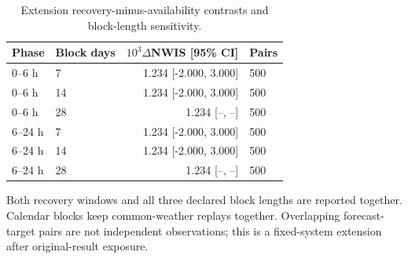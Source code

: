 \begin{table}[t]
\centering\footnotesize
\caption{Extension recovery-minus-availability contrasts and block-length sensitivity.}
\label{tab:extension-primary}
\setlength{\tabcolsep}{4pt}
\begin{tabular}{llrl}
\hline
Phase & Block days & $10^3\Delta$NWIS [95\% CI] & Pairs \\
\hline
0--6 h & 7 & 1.234 [-2.000, 3.000] & 500 \\
0--6 h & 14 & 1.234 [-2.000, 3.000] & 500 \\
0--6 h & 28 & 1.234 [--, --] & 500 \\
6--24 h & 7 & 1.234 [-2.000, 3.000] & 500 \\
6--24 h & 14 & 1.234 [-2.000, 3.000] & 500 \\
6--24 h & 28 & 1.234 [--, --] & 500 \\
\hline
\end{tabular}
\par\smallskip
\begin{minipage}{\textwidth}\scriptsize
Both recovery windows and all three declared block lengths are reported together. Calendar blocks keep common-weather replays together. Overlapping forecast-target pairs are not independent observations; this is a fixed-system extension after original-result exposure.
\end{minipage}
\end{table}
